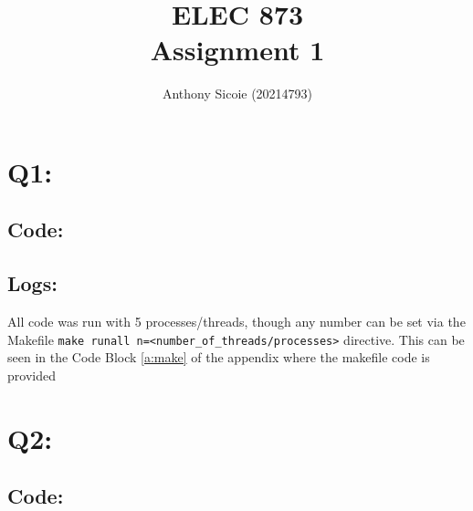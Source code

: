 \documentclass[11pt]{article}
\title{%
  ELEC 873 \\
Assignment 1}
\author{Anthony Sicoie (20214793)}
\begin{document}
\maketitle


\section*{Q1:}

\subsection*{Code:}




\subsection*{Logs:}
All code was run with 5 processes/threads, though any number can be set via the Makefile \texttt{make runall n=<number\_of\_threads/processes>} directive. 
This can be seen in the Code Block \ref{a:make} of the appendix where the makefile code is provided




\section*{Q2:}

\subsection*{Code:}



\end{document}
